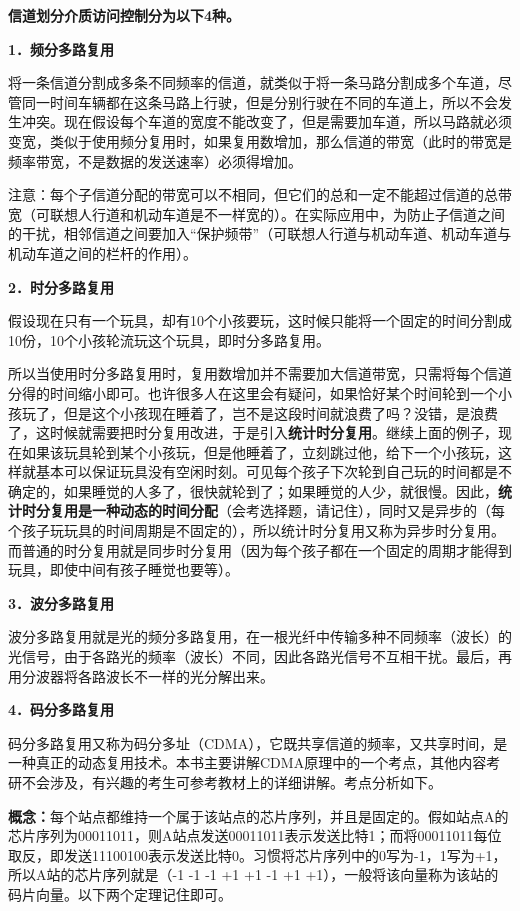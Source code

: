 \textbf{信道划分介质访问控制分为以下4种。}

{\textbf{1．频分多路复用}}

将一条信道分割成多条不同频率的信道，就类似于将一条马路分割成多个车道，尽管同一时间车辆都在这条马路上行驶，但是分别行驶在不同的车道上，所以不会发生冲突。现在假设每个车道的宽度不能改变了，但是需要加车道，所以马路就必须变宽，类似于使用频分复用时，如果复用数增加，那么信道的带宽（此时的带宽是频率带宽，不是数据的发送速率）必须得增加。

{注意：每个子信道分配的带宽可以不相同，但它们的总和一定不能超过信道的总带宽（可联想人行道和机动车道是不一样宽的）。在实际应用中，为防止子信道之间的干扰，相邻信道之间要加入``保护频带''（可联想人行道与机动车道、机动车道与机动车道之间的栏杆的作用）。}

\textbf{{2．时分多路复用}}

假设现在只有一个玩具，却有10个小孩要玩，这时候只能将一个固定的时间分割成10份，10个小孩轮流玩这个玩具，即时分多路复用。

所以当使用时分多路复用时，复用数增加并不需要加大信道带宽，只需将每个信道分得的时间缩小即可。也许很多人在这里会有疑问，如果恰好某个时间轮到一个小孩玩了，但是这个小孩现在睡着了，岂不是这段时间就浪费了吗？没错，是浪费了，这时候就需要把时分复用改进，于是引入\textbf{统计时分复用}。继续上面的例子，现在如果该玩具轮到某个小孩玩，但是他睡着了，立刻跳过他，给下一个小孩玩，这样就基本可以保证玩具没有空闲时刻。可见每个孩子下次轮到自己玩的时间都是不确定的，如果睡觉的人多了，很快就轮到了；如果睡觉的人少，就很慢。因此，\textbf{统计时分复用是一种动态的时间分配}（会考选择题，请记住），同时又是异步的（每个孩子玩玩具的时间周期是不固定的），所以统计时分复用又称为异步时分复用。而普通的时分复用就是同步时分复用（因为每个孩子都在一个固定的周期才能得到玩具，即使中间有孩子睡觉也要等）。

\textbf{{3．波分多路复用}}

波分多路复用就是光的频分多路复用，在一根光纤中传输多种不同频率（波长）的光信号，由于各路光的频率（波长）不同，因此各路光信号不互相干扰。最后，再用分波器将各路波长不一样的光分解出来。

\textbf{{4．码分多路复用}}

码分多路复用又称为码分多址（CDMA），它既共享信道的频率，又共享时间，是一种真正的动态复用技术。本书主要讲解CDMA原理中的一个考点，其他内容考研不会涉及，有兴趣的考生可参考教材上的详细讲解。考点分析如下。

\textbf{概念：}每个站点都维持一个属于该站点的芯片序列，并且是固定的。假如站点A的芯片序列为00011011，则A站点发送00011011表示发送比特1；而将00011011每位取反，即发送11100100表示发送比特0。习惯将芯片序列中的0写为-1，1写为+1，所以A站的芯片序列就是（-1
-1 -1 +1 +1 -1 +1
+1），一般将该向量称为该站的码片向量。以下两个定理记住即可。

